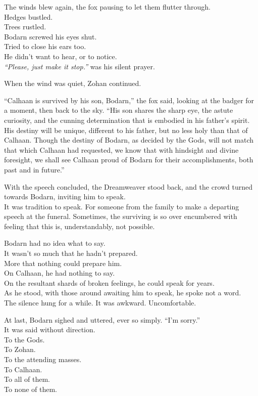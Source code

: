 The winds blew again, the fox pausing to let them flutter through.\\
Hedges bustled.\\
Trees rustled.\\
Bodarn screwed his eyes shut.\\
Tried to close his ears too.\\
He didn't want to hear, or to notice.\\
\emph{``Please, just make it stop.''} was his silent prayer.

When the wind was quiet, Zohan continued.

``Calhaan is survived by his son, Bodarn,'' the fox said, looking at the badger for a moment, then back to the sky. ``His son shares the sharp eye, the astute curiosity, and the cunning determination that is embodied in his father's spirit. His destiny will be unique, different to his father, but no less holy than that of Calhaan. Though the destiny of Bodarn, as decided by the Gods, will not match that which Calhaan had requested, we know that with hindsight and divine foresight, we shall see Calhaan proud of Bodarn for their accomplishments, both past and in future.''

With the speech concluded, the Dreamweaver stood back, and the crowd turned towards Bodarn, inviting him to speak.\\
It was tradition to speak. For someone from the family to make a departing speech at the funeral. Sometimes, the surviving is so over encumbered with feeling that this is, understandably, not possible.

Bodarn had no idea what to say.\\
It wasn't so much that he hadn't prepared.\\
More that nothing could prepare him.\\
On Calhaan, he had nothing to say.\\
On the resultant shards of broken feelings, he could speak for years.\\
As he stood, with those around awaiting him to speak, he spoke not a word.\\
The silence hung for a while. It was awkward. Uncomfortable.

At last, Bodarn sighed and uttered, ever so simply. ``I'm sorry.''\\
It was said without direction.\\
To the Gods.\\
To Zohan.\\
To the attending masses.\\
To Calhaan.\\
To all of them.\\
To none of them.

